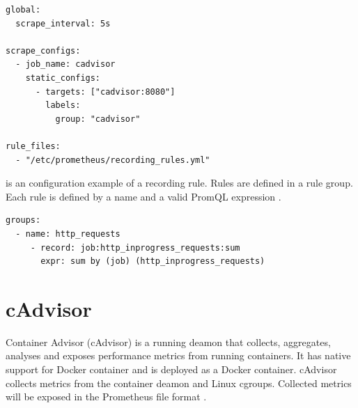 \begin{lstlisting}[label=lst:04_prom_config_example, caption=Prometheus configuration file example]
global:
  scrape_interval: 5s

scrape_configs:
  - job_name: cadvisor
    static_configs:
      - targets: ["cadvisor:8080"]
        labels:
          group: "cadvisor"
          
rule_files:
  - "/etc/prometheus/recording_rules.yml"
\end{lstlisting}

 is an configuration example of a recording rule.
Rules are defined in a rule group. Each rule is defined by a name and a valid PromQL expression \cite{Prom2020Docs}.

\begin{lstlisting}[label=lst:04_prom_config_rule-example, caption=Prometheus rules configuration file example]
groups:
  - name: http_requests
     - record: job:http_inprogress_requests:sum
       expr: sum by (job) (http_inprogress_requests)
\end{lstlisting}


\section{cAdvisor}
Container Advisor (cAdvisor) is a running deamon that collects, aggregates, analyses and exposes performance metrics from running containers.
It has native support for Docker container and is deployed as a Docker container.
cAdvisor collects metrics from the container deamon and Linux cgroups.
Collected metrics will be exposed in the Prometheus file format \cite{Bastos2019Prom, cadvisor2020Docs}.


